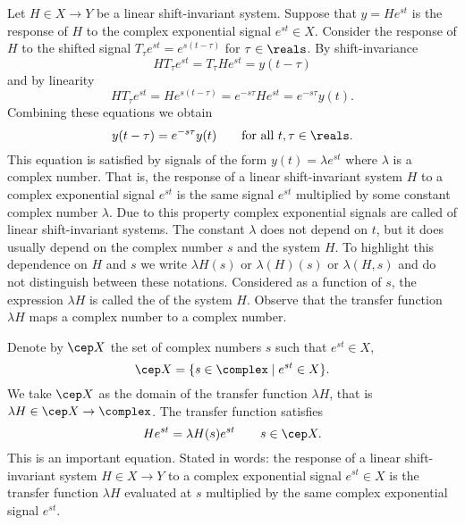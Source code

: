 Let $H \in X \to Y$ be a linear shift-invariant system.  Suppose that $y = H e^{st}$ is the response of $H$ to the complex exponential signal $e^{st} \in X$.  Consider the response of $H$ to the shifted signal $T_\tau e^{st} = e^{s(t-\tau)}$ for $\tau \in \reals$.  By shift-invariance
\[
H T_{\tau} e^{st} = T_{\tau} H  e^{st} = y(t - \tau) %
\]
and by linearity
\[
H T_\tau e^{st} = H e^{s(t-\tau)} = e^{-s\tau} H e^{st}  = e^{-s\tau} y(t). %
\]
Combining these equations we obtain
\[
y(t - \tau) = e^{-s\tau} y(t) \qquad \text{for all $t,\tau \in \reals$}.
\]
This equation is satisfied by signals of the form $y(t) = \lambda e^{st}$ where $\lambda$ is a complex number.  That is, the response of a linear shift-invariant system $H$ to a complex exponential signal $e^{st}$ is the same signal $e^{st}$ multiplied by some constant complex number $\lambda$.  Due to this property complex exponential signals are called  of linear shift-invariant systems.  The constant $\lambda$ does not depend on $t$, but it does usually depend on the complex number $s$ and the system $H$.  To highlight this dependence on $H$ and $s$ we write $\lambda H(s)$ or $\lambda(H)(s)$ or $\lambda(H,s)$ and do not distinguish between these notations.  Considered as a function of $s$, the expression $\lambda H$ is called the  of the system $H$.  Observe that the transfer function $\lambda H$ maps a complex number to a complex number.

Denote by $\cep X$ the set of complex numbers $s$ such that $e^{st} \in X$,
\[
\cep X = \{ s \in \complex \mid e^{st} \in X \}.
\]
We take $\cep X$ as the domain of the transfer function $\lambda H$, that is $\lambda H \in \cep X \to \complex$.  The transfer function satisfies
\begin{equation}\label{eq:transfuneigenproperty}
H e^{st} = \lambda H(s) e^{st} \qquad s \in \cep X.
\end{equation}
This is an important equation.  Stated in words: the response of a linear shift-invariant system $H \in X \to Y$ to a complex exponential signal $e^{st} \in X$ is the transfer function $\lambda H$ evaluated at $s$ multiplied by the same complex exponential signal $e^{st}$.

